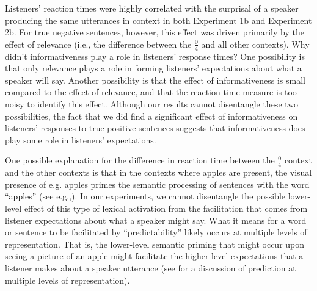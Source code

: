\documentclass[man, floatsintext, noapacite]{apa6}
\begin{document}

Listeners' reaction times were highly correlated with the surprisal of a speaker producing the same utterances in context in both Experiment 1b and Experiment 2b. For true negative sentences, however, this effect was driven primarily by the effect of relevance (i.e., the difference between the $\frac{0}{4}$ and all other contexts). Why didn't informativeness play a role in listeners' response times? One possibility is that only relevance plays a role in forming listeners' expectations about what a speaker will say. Another possibility is that the effect of informativeness is small compared to the effect of relevance, and that the reaction time measure is too noisy to identify this effect. Although our results cannot disentangle these two possibilities, the fact that we did find a significant effect of informativeness on listeners' responses to true positive sentences suggests that informativeness does play some role in listeners' expectations. 

One possible explanation for the difference in reaction time between the $\frac{0}{4}$ context and the other contexts is that in the contexts where apples are present, the visual presence of e.g. apples primes the semantic processing of sentences with the word ``apples'' (see e.g.,). In our experiments, we cannot disentangle the possible lower-level effect of this type of lexical activation from the facilitation that comes from listener expectations about what a speaker might say. What it means for a word or sentence to be facilitated by ``predictability'' likely occurs at multiple levels of representation. That is, the lower-level semantic priming that might occur upon seeing a picture of an apple might facilitate the higher-level expectations that a listener makes about a speaker utterance (see  for a discussion of prediction at multiple levels of representation). 
\end{document}
